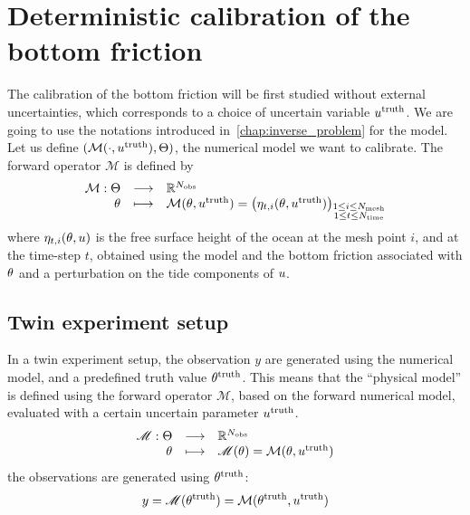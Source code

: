 \documentclass[../../Main_ManuscritThese.tex]{subfiles}
\begin{document}
\section{Deterministic calibration of the bottom friction}
\label{sec:deterministic_calibration_bott}
The calibration of the bottom friction will be first studied without
external uncertainties, which corresponds to a choice of uncertain
variable $u^{\mathrm{truth}}$.
We are going to use the notations introduced
in~\cref{chap:inverse_problem} for the model. Let us define
$(\mathcal{M}(\cdot,u^{\mathrm{truth}}),\Theta)$, the numerical
model we want to calibrate. The forward operator $\mathcal{M}$ is
defined by
\begin{equation}
  \begin{array}{rcl}
    \mathcal{M}: \Theta  &\longrightarrow& \mathbb{R}^{N_{\mathrm{obs}}} \\
    \theta & \longmapsto & \mathcal{M}(\theta, u^{\mathrm{truth}}) = \left(\eta_{t,i}(\theta, u^{\mathrm{truth}})\right)_{\substack{1 \leq i \leq N_{\mathrm{mesh}} \\ 1 \leq t \leq N_{\mathrm{time}}}} \\ 
  \end{array}
\end{equation}
where $\eta_{t,i}(\theta,u)$ is the free surface height of the ocean at
the mesh point $i$, and at the time-step $t$, obtained using the model
and the bottom friction associated with $\theta$ and a perturbation on
the tide components of $u$.

\subsection{Twin experiment setup}
In a twin experiment setup, the observation $y$ are generated using
the numerical model, and a predefined truth value
$\theta^{\mathrm{truth}}$.  This means that the ``physical model'' is
defined using the forward operator $\mathscr{M}$, based on the forward
numerical model, evaluated with a certain uncertain parameter
$u^{\mathrm{truth}}$.
\begin{equation}
  \label{eq:twin_exp}
  \begin{array}{rcl}
    \mathscr{M}: \Theta &\longrightarrow & \mathbb{R}^{N_{\mathrm{obs}}} \\
    \theta & \longmapsto &\mathscr{M}(\theta) = \mathcal{M}(\theta, u^{\mathrm{truth}})
  \end{array}
\end{equation}
the observations are generated using $\theta^{\mathrm{truth}}$:
\begin{equation}
  y = \mathscr{M}(\theta^{\mathrm{truth}}) = \mathcal{M}(\theta^{\mathrm{truth}}, u^{\mathrm{truth}})
\end{equation}
\end{document}
